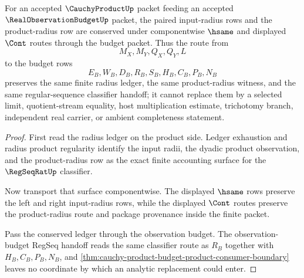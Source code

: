 \begin{theorem}
\label{thm:cauchy-product-radius-budget-conservation}
For an accepted $\CauchyProductUp$ packet feeding an accepted $\RealObservationBudgetUp$ packet, the paired input-radius rows and the product-radius row are conserved under componentwise $\hsame$ and displayed $\Cont$ routes through the budget packet. Thus the route from
$$
M_X,M_Y,Q_X,Q_Y,L
$$
to the budget rows
$$
E_B,W_B,D_B,R_B,S_B,H_B,C_B,P_B,N_B
$$
preserves the same finite radius ledger, the same product-radius witness, and the same regular-sequence classifier handoff; it cannot replace them by a selected limit, quotient-stream equality, host multiplication estimate, trichotomy branch, independent real carrier, or ambient completeness statement.
\end{theorem}
\begin{proof}
First read the radius ledger on the product side. Ledger exhaustion and radius product regularity identify the input radii, the dyadic product observation, and the product-radius row as the exact finite accounting surface for the $\RegSeqRatUp$ classifier.

Now transport that surface componentwise. The displayed $\hsame$ rows preserve the left and right input-radius rows, while the displayed $\Cont$ routes preserve the product-radius route and package provenance inside the finite packet.

Pass the conserved ledger through the observation budget. The observation-budget RegSeq handoff reads the same classifier route as $R_B$ together with $H_B,C_B,P_B,N_B$, and \autoref{thm:cauchy-product-budget-product-consumer-boundary} leaves no coordinate by which an analytic replacement could enter.
\end{proof}

